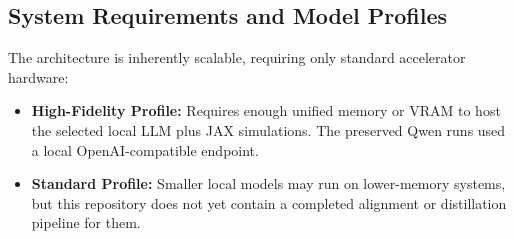 \subsection{System Requirements and Model Profiles}
The architecture is inherently scalable, requiring only standard accelerator hardware:
\begin{itemize}
    \item \textbf{High-Fidelity Profile:} Requires enough unified memory or VRAM to host the selected local LLM plus JAX simulations. The preserved Qwen runs used a local OpenAI-compatible endpoint.
    \item \textbf{Standard Profile:} Smaller local models may run on lower-memory systems, but this repository does not yet contain a completed alignment or distillation pipeline for them.
\end{itemize}
